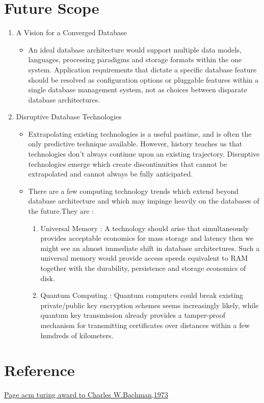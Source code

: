 \documentclass[a4paper]{article}
\begin{document}
\section{Future Scope}
\begin{enumerate}
\item A Vision for a Converged Database
\begin{itemize}
\item An ideal database architecture would support multiple data models, languages, processing paradigms and storage formats within the one system.   Application requirements that dictate a specific database feature should be resolved as configuration options or pluggable features within a single database management system, not as choices between disparate database architectures.
\end{itemize}
\item Disruptive Database Technologies
\begin{itemize}
\item Extrapolating existing technologies is a useful pastime, and is often the only predictive technique available.  However, history teaches us that technologies don’t always continue upon an existing trajectory.  Disruptive technologies emerge which create discontinuities that cannot be extrapolated and cannot always be fully anticipated.
\item There are a few computing technology trends which extend beyond database architecture and which may impinge heavily on the databases of the future.They are : 
\begin{enumerate}
\item Universal Memory : A technology should arise that simultaneously provides acceptable economics for mass storage and latency then we might see an almost immediate shift in database architectures.  Such a universal memory would provide access speeds equivalent to RAM together with the durability, persistence and storage economics of disk.
\item Quantum Computing : Quantum computers could break existing private/public key encryption schemes seems increasingly likely, while quantum key transmission already provides a tamper-proof mechanism for transmitting certificates over distances within a few hundreds of kilometers. 
\end{enumerate}
\end{itemize}
\end{enumerate}
\section{Reference}
\hspace{1cm} \href{http://amturing.acm.org/award_winners/bachman_9385610.cfm}{Page acm turing award to Charles W.Bachman,1973}
\end{document}
